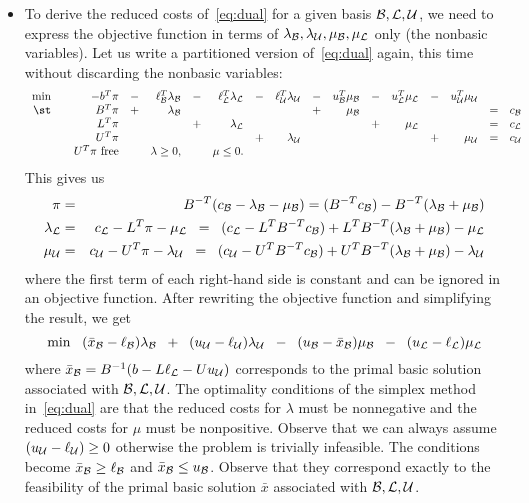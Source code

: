 \begin{itemize}
\item To derive the reduced costs of~\eqref{eq:dual} for a given basis
	$\mathcal{B}, \mathcal{L}, \mathcal{U}$, we need to express the objective function
	in terms of $\lambda_{\mathcal{B}}, \lambda_{\mathcal{U}}, \mu_{\mathcal{B}}, \mu_{\mathcal{L}}$
	only (the nonbasic variables). Let us write a partitioned
	version of~\eqref{eq:dual} again, this time without discarding
	the nonbasic variables:
\[
\begin{array}{rcrcrcrcrcrcrcrcl}
\min & & -b^T \pi
	& - & \ell_{\B}^T \lambda_{\B}
	& - & \ell_{\NL}^T \lambda_{\NL}
	& - & \ell_{\NU}^T \lambda_{\NU}
	& - & u_{\B}^T \mu_{\B}
	& - & u_{\NL}^T \mu_{\NL}
	& - & u_{\NU}^T \mu_{\NU}
	& & \\
\st  & & B^T \pi & + & \lambda_{\B} & & & & & + & \mu_{\B} & & & & & = & c_{\B} \\
     & & L^T \pi & & & + & \lambda_{\NL} & & & & & + & \mu_{\NL} & & & = & c_{\NL} \\
     & & U^T \pi & & & & & + & \lambda_{\NU} & & & & & + & \mu_{\NU} & = & c_{\NU} \\
     & & U^T \pi \text{ free} & & \lambda \geq 0, & &  \mu \leq 0. & & 
\end{array}
\]
	This gives us
\begin{eqnarray*}
\pi & = & B^{-T} (c_{\mathcal{B}} - \lambda_{\mathcal{B}} - \mu_{\mathcal{B}}) = (B^{-T} c_{\mathcal{B}}) - B^{-T} (\lambda_{\mathcal{B}} + \mu_{\mathcal{B}}) \\
\lambda_{\mathcal{L}} & = & c_{\mathcal{L}} - L^T \pi - \mu_{\mathcal{L}}
	\;\; = \;\; (c_{\mathcal{L}} - L^T B^{-T} c_{\mathcal{B}}) + L^T B^{-T} (\lambda_{\mathcal{B}} + \mu_{\mathcal{B}}) - \mu_{\mathcal{L}} \\
\mu_{\mathcal{U}} & = & c_{\mathcal{U}} - U^T \pi - \lambda_{\mathcal{U}}
	\;\; = \;\; (c_{\mathcal{U}} - U^T B^{-T} c_{\mathcal{B}}) + U^T B^{-T} (\lambda_{\mathcal{B}} + \mu_{\mathcal{B}}) - \lambda_{\mathcal{U}}
\end{eqnarray*}
	where the first term of each right-hand side is constant and can be
	ignored in an objective function. After rewriting the objective
	function and simplifying the result, we get
\[
 \min \;\;\; 
             (\bar x_{\mathcal{B}} - \ell_{\mathcal{B}}) \lambda_{\mathcal{B}} 
 \;\; + \;\; (u_{\mathcal{U}} - \ell_{\mathcal{U}}) \lambda_{\mathcal{U}}
 \;\; - \;\; (u_{\mathcal{B}} - \bar x_{\mathcal{B}}) \mu_{\mathcal{B}}
 \;\; - \;\; (u_{\mathcal{L}} - \ell_{\mathcal{L}}) \mu_{\mathcal{L}}
\]
	where $\bar x_{\mathcal{B}} = B^{-1} (b - L \ell_{\mathcal{L}} - U u_{\mathcal{U}})$
	corresponds to the primal basic solution associated
	with $\mathcal{B}, \mathcal{L}, \mathcal{U}$.
	The optimality conditions of the simplex method
	in~\eqref{eq:dual} are that
	the reduced costs for $\lambda$ must be nonnegative
	and the reduced costs for $\mu$ must be nonpositive.
	Observe that we can always assume $(u_{\mathcal{U}} - \ell_{\mathcal{U}}) \geq 0$
	otherwise the problem is trivially infeasible.
	The conditions become $\bar x_{\mathcal{B}} \geq \ell_{\mathcal{B}}$ and
	$\bar x_{\mathcal{B}} \leq u_{\mathcal{B}}$. Observe that they correspond
	exactly to the feasibility of the primal basic solution $\bar x$
	associated with $\mathcal{B}, \mathcal{L}, \mathcal{U}$.
\end{itemize}



